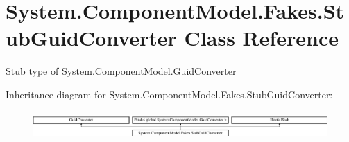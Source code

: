 \hypertarget{class_system_1_1_component_model_1_1_fakes_1_1_stub_guid_converter}{\section{System.\-Component\-Model.\-Fakes.\-Stub\-Guid\-Converter Class Reference}
\label{class_system_1_1_component_model_1_1_fakes_1_1_stub_guid_converter}
}


Stub type of System.\-Component\-Model.\-Guid\-Converter 


Inheritance diagram for System.\-Component\-Model.\-Fakes.\-Stub\-Guid\-Converter\-:\begin{figure}[H]
\begin{center}
\leavevmode
\includegraphics[height=1.101278cm]{class_system_1_1_component_model_1_1_fakes_1_1_stub_guid_converter}
\end{center}
\end{figure}
